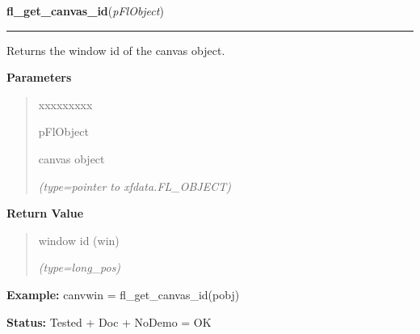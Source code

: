     \vspace{0.5ex}

\hspace{.8\funcindent}\begin{boxedminipage}{\funcwidth}

    \raggedright \textbf{fl\_get\_canvas\_id}(\textit{pFlObject})

    \vspace{-1.5ex}

    \rule{\textwidth}{0.5\fboxrule}
\setlength{\parskip}{2ex}
    Returns the window id of the canvas object.

\setlength{\parskip}{1ex}
      \textbf{Parameters}
      \vspace{-1ex}

      \begin{quote}
        \begin{Ventry}{xxxxxxxxx}

          \item[pFlObject]

          canvas object

            {\it (type=pointer to xfdata.FL\_OBJECT)}

        \end{Ventry}

      \end{quote}

      \textbf{Return Value}
    \vspace{-1ex}

      \begin{quote}
      window id (win)

      {\it (type=long\_pos)}

      \end{quote}

\textbf{Example:} canvwin = fl\_get\_canvas\_id(pobj)



\textbf{Status:} Tested + Doc + NoDemo = OK



    \end{boxedminipage}

    \label{xformslib:flcanvas:fl_get_canvas_colormap}

    \vspace{0.5ex}

